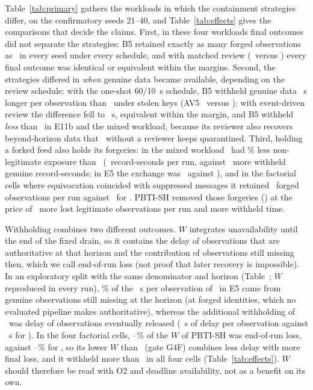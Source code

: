 Table~\ref{tab:primary} gathers the workloads in which the containment strategies differ, on the confirmatory seeds 21--40, and Table~\ref{tab:effects} gives the comparisons that decide the claims. First, in these four workloads final outcomes did not separate the strategies: B5 retained exactly as many forged observations as \sys\ in every seed under every schedule, and with matched review (\Bev\ versus \Rev) every final outcome was identical or equivalent within the margins. Second, the strategies differed in \emph{when} genuine data became available, depending on the review schedule: with the one-shot 60/10~s schedule, B5 withheld genuine data \WAoneEfiveBFivehistvsPBTIWdshort~s longer per observation than \sys\ under stolen keys (AV5 \XPrimEfiveBFivehistAVFive\ versus \XPrimEfivePBTIAVFive); with event-driven review the difference fell to \WAoneEfiveBFiveeventvsPBTIWd~s, equivalent within the margin, and B5 withheld \emph{less} than \sys\ in E11b and the mixed workload, because its reviewer also recovers beyond-horizon data that \sys\ without a reviewer keeps quarantined. Third, holding a forked feed also holds its forgeries: in the mixed workload \Bhist\ had \XRelMixedNLXBFivehist\% less non-legitimate exposure than \sys\ (\XTradeMixedNLX\ record-seconds per run, against \XTradeMixedWrec\ more withheld genuine record-seconds; in E5 the exchange was \XTradeEfiveWrec\ against \XTradeEfiveNLX), and in the factorial cells where equivocation coincided with suppressed messages it retained \XPrimFGBFivehistOOne\ forged observations per run against \XPrimFGPBTIOOne\ for \sys. PBTI-SH removed those forgeries (\XPrimFGPBTISHOOne) at the price of \XFGSHOtwoExtra\ more lost legitimate observations per run and more withheld time.

Withholding combines two different outcomes. $W$ integrates unavailability until the end of the fixed drain, so it contains the delay of observations that are authoritative at that horizon and the contribution of observations still missing then, which we call end-of-run loss (not proof that later recovery is impossible). In an exploratory split with the same denominator and horizon (Table~; $W$ reproduced in every run), \YWdEfivePBTILossPct\% of the \YWdEfivePBTIW~s per observation of \sys\ in E5 came from genuine observations still missing at the horizon (at forged identities, which no evaluated pipeline makes authoritative), whereas the additional withholding of \Bhist\ was delay of observations eventually released (\YWdEfiveBhistDelay~s of delay per observation against \YWdEfivePBTIDelay~s for \sys). In the four factorial cells, \YWdFGSHLossPctMin--\YWdFGSHLossPctMax\% of the $W$ of PBTI-SH was end-of-run loss, against \YWdFGBhistLossPctMin--\YWdFGBhistLossPctMax\% for \Bhist, so its lower $W$ than \Bhist\ (gate G4F) combines less delay with more final loss, and it withheld more than \Bev\ in all four cells (Table~\ref{tab:effects}). $W$ should therefore be read with O2 and deadline availability, not as a benefit on its own.

